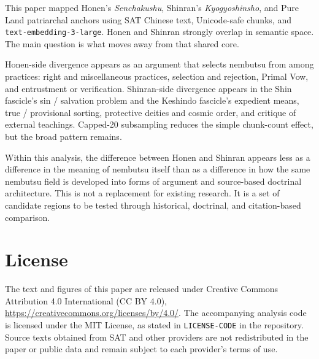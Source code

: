 \documentclass[uplatex,dvipdfmx,11pt,a4paper]{jsarticle}
\begin{document}
This paper mapped Honen's \emph{Senchakushu}, Shinran's \emph{Kyogyoshinsho}, and Pure Land patriarchal anchors using SAT Chinese text, Unicode-safe chunks, and \texttt{text-embedding-3-large}. Honen and Shinran strongly overlap in semantic space. The main question is what moves away from that shared core.

Honen-side divergence appears as an argument that selects nembutsu from among practices: right and miscellaneous practices, selection and rejection, Primal Vow, and entrustment or verification. Shinran-side divergence appears in the Shin fascicle's sin / salvation problem and the Keshindo fascicle's expedient means, true / provisional sorting, protective deities and cosmic order, and critique of external teachings. Capped-20 subsampling reduces the simple chunk-count effect, but the broad pattern remains.

Within this analysis, the difference between Honen and Shinran appears less as a difference in the meaning of nembutsu itself than as a difference in how the same nembutsu field is developed into forms of argument and source-based doctrinal architecture. This is not a replacement for existing research. It is a set of candidate regions to be tested through historical, doctrinal, and citation-based comparison.

\section*{License}

The text and figures of this paper are released under Creative Commons Attribution 4.0 International (CC BY 4.0), \url{https://creativecommons.org/licenses/by/4.0/}. The accompanying analysis code is licensed under the MIT License, as stated in \texttt{LICENSE-CODE} in the repository. Source texts obtained from SAT and other providers are not redistributed in the paper or public data and remain subject to each provider's terms of use.
\end{document}
